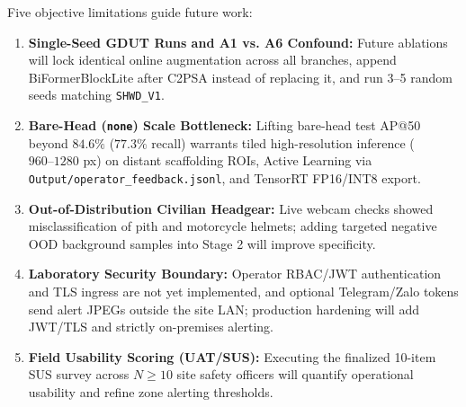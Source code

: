 Five objective limitations guide future work:
\begin{enumerate}[leftmargin=1.8em, itemsep=2.5pt]
  \item \textbf{Single-Seed GDUT Runs and A1 vs. A6 Confound:} Future ablations will lock identical online augmentation across all branches, append BiFormerBlockLite after C2PSA instead of replacing it, and run 3--5 random seeds matching \texttt{SHWD\_V1}.
  \item \textbf{Bare-Head (\texttt{none}) Scale Bottleneck:} Lifting bare-head test AP@50 beyond $84.6\%$ ($77.3\%$ recall) warrants tiled high-resolution inference ($960\text{--}1280$ px) on distant scaffolding ROIs, Active Learning via \nolinkurl{Output/operator_feedback.jsonl}, and TensorRT FP16/INT8 export.
  \item \textbf{Out-of-Distribution Civilian Headgear:} Live webcam checks showed misclassification of pith and motorcycle helmets; adding targeted negative OOD background samples into Stage 2 will improve specificity.
  \item \textbf{Laboratory Security Boundary:} Operator RBAC/JWT authentication and TLS ingress are not yet implemented, and optional Telegram/Zalo tokens send alert JPEGs outside the site LAN; production hardening will add JWT/TLS and strictly on-premises alerting.
  \item \textbf{Field Usability Scoring (UAT/SUS):} Executing the finalized 10-item SUS survey across $N \ge 10$ site safety officers will quantify operational usability and refine zone alerting thresholds.
\end{enumerate}
